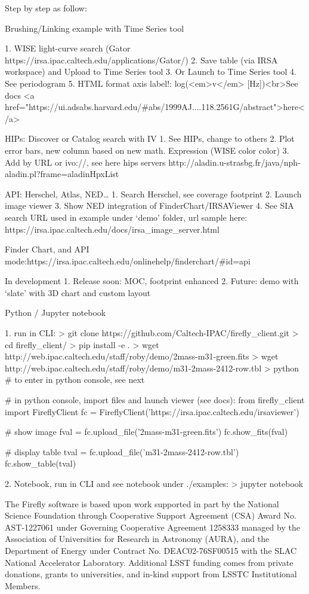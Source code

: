 \documentclass[11pt,twoside]{article}
\begin{document}
Step by step as follow:

Brushing/Linking example with Time Series tool

1. WISE light-curve search (Gator https://irsa.ipac.caltech.edu/applications/Gator/)
2. Save table (via IRSA workspace) and Upload to Time Series tool
3. Or Launch to Time Series tool
4. See periodogram
5. HTML format axis label!: log(<em>v</em> [Hz])<br>See docs <a href="https://ui.adsabs.harvard.edu/#abs/1999AJ....118.2561G/abstract">here</a>

HIPs: Discover or Catalog search with IV
1. See HIPs, change to others
2. Plot error bars, new column based on new math. Expression (WISE color color)
3. Add by URL or ivo://, see here hips servers http://aladin.u-strasbg.fr/java/nph-aladin.pl?frame=aladinHpxList

API: Herschel, Atlas, NED…
1. Search Herschel, see coverage footprint
2. Launch image viewer
3. Show NED integration of FinderChart/IRSAViewer
4. See SIA search URL used in example under ‘demo’ folder, url sample here: https://irsa.ipac.caltech.edu/docs/irsa_image_server.html

Finder Chart, and API mode:https://irsa.ipac.caltech.edu/onlinehelp/finderchart/#id=api

In development
1. Release soon: MOC, footprint enhanced
2. Future:  demo with ‘slate’ with 3D chart and custom layout

Python / Jupyter notebook

1. run in CLI:
> git clone https://github.com/Caltech-IPAC/firefly_client.git
> cd firefly_client/
> pip install -e .
> wget http://web.ipac.caltech.edu/staff/roby/demo/2mass-m31-green.fits
> wget http://web.ipac.caltech.edu/staff/roby/demo/m31-2mass-2412-row.tbl
> python # to enter in python console, see next

# in python console, import files and launch viewer (see docs):
 from firefly_client import FireflyClient
 fc = FireflyClient('https://irsa.ipac.caltech.edu/irsaviewer')

# show image
 fval = fc.upload_file('2mass-m31-green.fits')
 fc.show_fits(fval)

# display table
  tval = fc.upload_file('m31-2mass-2412-row.tbl')
  fc.show_table(tval)

2. Notebook, run in CLI and see notebook under ./examples:
> jupyter notebook

\acknowledgements

The Firefly software is based upon work supported in part by the National
Science Foundation through Cooperative Support Agreement (CSA) Award No. AST-1227061 under Governing
Cooperative Agreement 1258333 managed by the Association of Universities for Research in Astronomy (AURA), and
the Department of Energy under Contract No. DEAC02-76SF00515 with the SLAC National Accelerator Laboratory.
Additional LSST funding comes from private donations, grants to universities, and in-kind support from LSSTC
Institutional Members.
\end{document}
